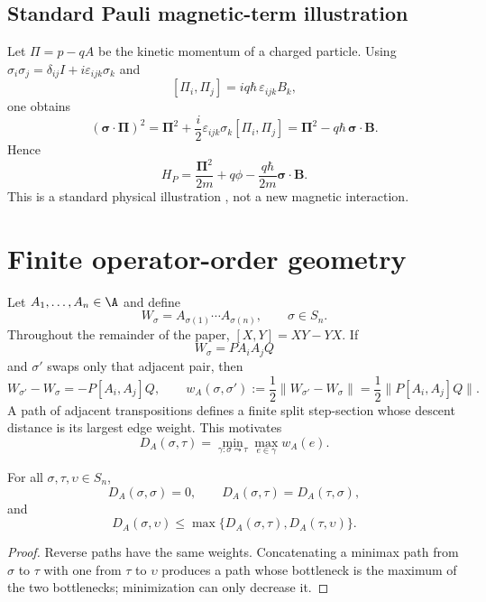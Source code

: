 \subsection{Standard Pauli magnetic-term illustration}
Let $\Pi=p-qA$ be the kinetic momentum of a charged particle. Using $\sigma_i\sigma_j=\delta_{ij}I+i\varepsilon_{ijk}\sigma_k$ and
\[
[\Pi_i,\Pi_j]=iq\hbar\,\varepsilon_{ijk}B_k,
\]
one obtains
\begin{equation}\label{eq:pauli}
(\boldsymbol\sigma\cdot\boldsymbol\Pi)^2
=\boldsymbol\Pi^2+\frac{i}{2}\varepsilon_{ijk}\sigma_k[\Pi_i,\Pi_j]
=\boldsymbol\Pi^2-q\hbar\,\boldsymbol\sigma\cdot\mathbf B.
\end{equation}
Hence
\[
H_P=\frac{\boldsymbol\Pi^2}{2m}+q\phi-\frac{q\hbar}{2m}\boldsymbol\sigma\cdot\mathbf B.
\]
This is a standard physical illustration \cite{ref16}, not a new magnetic interaction.

\section{Finite operator-order geometry}
Let $A_1,\dots,A_n\in\A$ and define
\[
W_\sigma=A_{\sigma(1)}\cdots A_{\sigma(n)},\qquad \sigma\in S_n.
\]
Throughout the remainder of the paper, $[X,Y]=XY-YX$. If
\[
W_\sigma=P A_iA_jQ
\]
and $\sigma'$ swaps only that adjacent pair, then
\begin{equation}\label{eq:contexts}
W_{\sigma'}-W_\sigma=-P[A_i,A_j]Q,
\qquad
w_A(\sigma,\sigma'):=\frac12\|W_{\sigma'}-W_\sigma\|
=\frac12\|P[A_i,A_j]Q\|.
\end{equation}
A path of adjacent transpositions defines a finite split step-section whose descent distance is its largest edge weight. This motivates
\begin{equation}\label{eq:DA}
D_A(\sigma,\tau)=\min_{\gamma:\sigma\leadsto\tau}\max_{e\in\gamma}w_A(e).
\end{equation}

\begin{theorem}\label{thm:pseudo}
For all $\sigma,\tau,\upsilon\in S_n$,
\[
D_A(\sigma,\sigma)=0,\qquad
D_A(\sigma,\tau)=D_A(\tau,\sigma),
\]
and
\[
D_A(\sigma,\upsilon)\le \max\{D_A(\sigma,\tau),D_A(\tau,\upsilon)\}.
\]
\end{theorem}
\begin{proof}
Reverse paths have the same weights. Concatenating a minimax path from $\sigma$ to $\tau$ with one from $\tau$ to $\upsilon$ produces a path whose bottleneck is the maximum of the two bottlenecks; minimization can only decrease it.
\end{proof}

